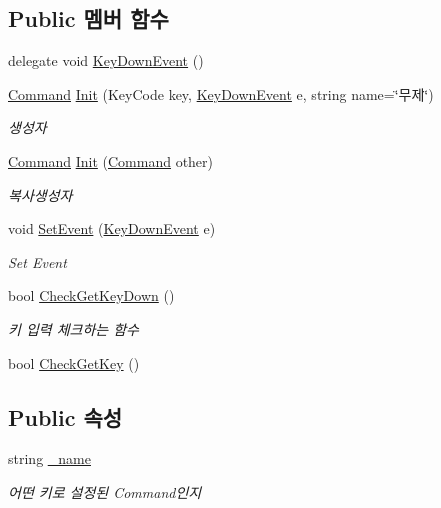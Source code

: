 \subsection*{Public 멤버 함수}
\begin{DoxyCompactItemize}
\item 
delegate void \mbox{\hyperlink{class_command_acc714b5e0de57b7f24b2619fff860b9d}{Key\+Down\+Event}} ()
\item 
\mbox{\hyperlink{class_command}{Command}} \mbox{\hyperlink{class_command_afc8d0350d5935d74a3685f427173d62e}{Init}} (Key\+Code key, \mbox{\hyperlink{class_command_acc714b5e0de57b7f24b2619fff860b9d}{Key\+Down\+Event}} e, string name=\char`\"{}무제\char`\"{})
\begin{DoxyCompactList}\small\item\em 생성자 \end{DoxyCompactList}\item 
\mbox{\hyperlink{class_command}{Command}} \mbox{\hyperlink{class_command_a4f0000c27196a2cb5f5c3a38ce0ff952}{Init}} (\mbox{\hyperlink{class_command}{Command}} other)
\begin{DoxyCompactList}\small\item\em 복사생성자 \end{DoxyCompactList}\item 
void \mbox{\hyperlink{class_command_a306ef92268d70413bf59adaa36a35b07}{Set\+Event}} (\mbox{\hyperlink{class_command_acc714b5e0de57b7f24b2619fff860b9d}{Key\+Down\+Event}} e)
\begin{DoxyCompactList}\small\item\em Set Event \end{DoxyCompactList}\item 
bool \mbox{\hyperlink{class_command_ac35514f10fbf789814e9ce5431a26562}{Check\+Get\+Key\+Down}} ()
\begin{DoxyCompactList}\small\item\em 키 입력 체크하는 함수 \end{DoxyCompactList}\item 
bool \mbox{\hyperlink{class_command_aae2d7670c9ee25e629d3702579416095}{Check\+Get\+Key}} ()
\end{DoxyCompactItemize}
\subsection*{Public 속성}
\begin{DoxyCompactItemize}
\item 
string \mbox{\hyperlink{class_command_a18a8a95d7f2c65bfa786fb525c42d0c4}{\+\_\+name}}
\begin{DoxyCompactList}\small\item\em 어떤 키로 설정된 Command인지 \end{DoxyCompactList}\end{DoxyCompactItemize}
